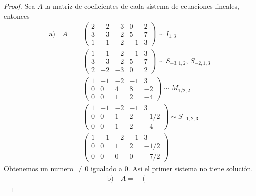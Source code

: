 \documentclass[11pt,letterpaper]{article}
\begin{document}
\begin{proof}
    Sea $A$ la matriz de coeficientes de cada sistema de ecuaciones lineales, entonces
    \begin{align*}
        \text{a)} \quad A =
            &\left(
            \begin{array}{cccc|c}
                2 & -2 & -3 & 0 & 2 \\
                3 & -3 & -2 & 5 & 7 \\
                1 & -1 & -2 & -1 & 3
            \end{array}\right) \sim I_{1,3}\\[10pt]
            &\left(
            \begin{array}{cccc|c}
                1 & -1 & -2 & -1 & 3 \\
                3 & -3 & -2 & 5 & 7\\
                2 & -2 & -3 & 0 & 2
            \end{array}\right) \sim S_{-3,1,2},\,S_{-2,1,3}\\[10pt]
            &\left(
            \begin{array}{cccc|c}
                1 & -1 & -2 & -1 & 3 \\
                0 & 0 & 4 & 8 & -2\\
                0 & 0 & 1 & 2 & -4
            \end{array}\right) \sim M_{1/2,2}\\[10pt]
            &\left(
            \begin{array}{cccc|c}
                1 & -1 & -2 & -1 &3\\
                0 & 0 & 1 & 2 & -1/2\\
                0 & 0 & 1 & 2 & -4
            \end{array}\right) \sim S_{-1,2,3}\\[10pt]
           &\left(
            \begin{array}{cccc|c}
                1 & -1 & -2 & -1 & 3\\
                0 & 0 & 1 & 2 & -1/2\\
                0 & 0 & 0 & 0 & -7/2
            \end{array}\right)
    \end{align*}
Obtenemos un numero $\neq0$ igualado a $0$. Asi el primer sistema no tiene solución.\\
    \begin{align*}
        \text{b)} \quad A=
        &\left(
        \begin{array}{ccc|c}

\end{array}
\end{align*}
\end{proof}
\end{document}
